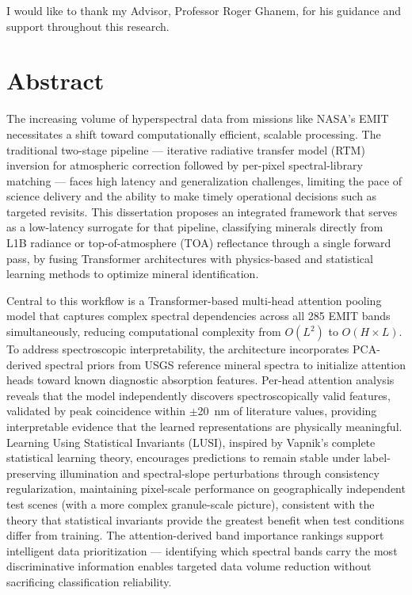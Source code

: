 \documentclass[11pt]{report}
\begin{document}
I would like to thank my Advisor, Professor Roger Ghanem, for his guidance and support throughout this research. 



\newpage

\tableofcontents
\newpage

\listoftables
{}
\newpage

\listoffigures
{}
\newpage

\chapter*{Abstract}

The increasing volume of hyperspectral data from missions like NASA's EMIT necessitates a shift toward computationally efficient, scalable processing. The traditional two-stage pipeline --- iterative radiative transfer model (RTM) inversion for atmospheric correction followed by per-pixel spectral-library matching --- faces high latency and generalization challenges, limiting the pace of science delivery and the ability to make timely operational decisions such as targeted revisits. This dissertation proposes an integrated framework that serves as a low-latency surrogate for that pipeline, classifying minerals directly from L1B radiance or top-of-atmosphere (TOA) reflectance through a single forward pass, by fusing Transformer architectures with physics-based and statistical learning methods to optimize mineral identification.

Central to this workflow is a Transformer-based multi-head attention pooling model that captures complex spectral dependencies across all 285 EMIT bands simultaneously, reducing computational complexity from $O(L^2)$ to $O(H \times L)$. To address spectroscopic interpretability, the architecture incorporates PCA-derived spectral priors from USGS reference mineral spectra to initialize attention heads toward known diagnostic absorption features. Per-head attention analysis reveals that the model independently discovers spectroscopically valid features, validated by peak coincidence within $\pm$20~nm of literature values, providing interpretable evidence that the learned representations are physically meaningful. Learning Using Statistical Invariants (LUSI), inspired by Vapnik's complete statistical learning theory, encourages predictions to remain stable under label-preserving illumination and spectral-slope perturbations through consistency regularization, maintaining pixel-scale performance on geographically independent test scenes (with a more complex granule-scale picture), consistent with the theory that statistical invariants provide the greatest benefit when test conditions differ from training. The attention-derived band importance rankings support intelligent data prioritization --- identifying which spectral bands carry the most discriminative information enables targeted data volume reduction without sacrificing classification reliability.
\end{document}
